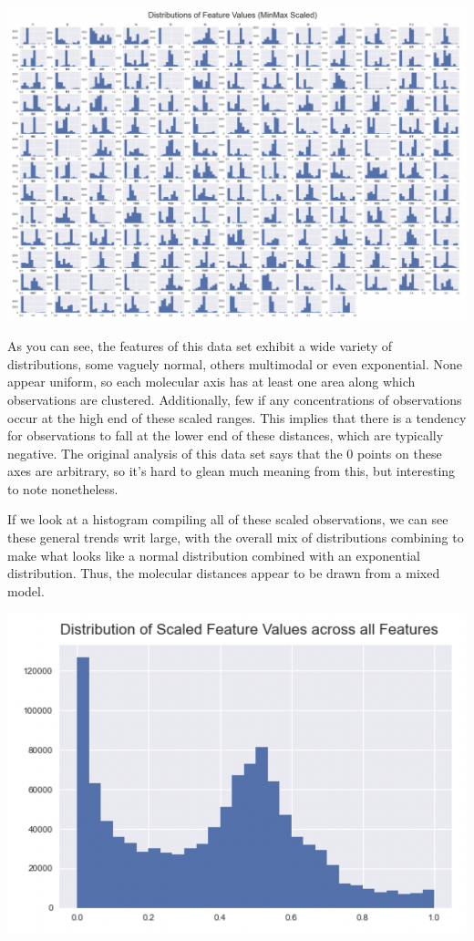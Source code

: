 \documentclass[12pt]{article}
\begin{document}
\includegraphics[scale=.47]{feature_distribs.jpg}

As you can see, the features of this data set exhibit a wide variety of distributions, some vaguely normal, others multimodal or even exponential. None appear uniform, so each molecular axis has at least one area along which observations are clustered. Additionally, few if any concentrations of observations occur at the high end of these scaled ranges. This implies that there is a tendency for observations to fall at the lower end of these distances, which are typically negative. The original analysis of this data set says that the 0 points on these axes are arbitrary, so it's hard to glean much meaning from this, but interesting to note nonetheless.

If we look at a histogram compiling all of these scaled observations, we can see these general trends writ large, with the overall mix of distributions combining to make what looks like a normal distribution combined with an exponential distribution. Thus, the molecular distances appear to be drawn from a mixed model.

\includegraphics[scale=.8]{all_feature_distrib.jpg}
\end{document}
